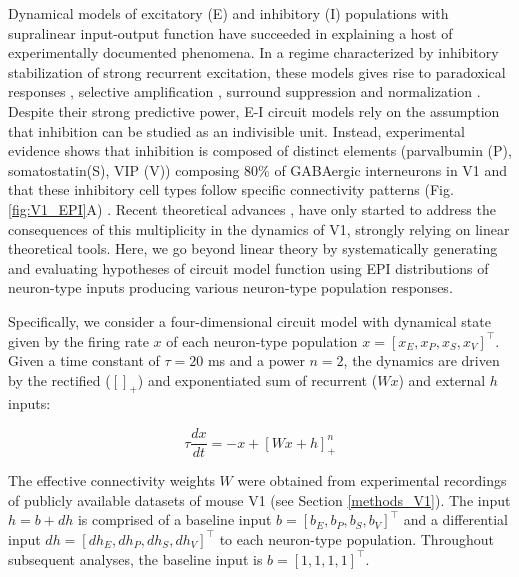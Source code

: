 \documentclass[11pt]{article}
\begin{document}
Dynamical models of excitatory (E) and inhibitory (I) populations with supralinear input-output function have succeeded in explaining a host of experimentally documented phenomena.
In a regime characterized by inhibitory stabilization of strong recurrent excitation, these models gives rise to paradoxical responses \cite{tsodyks1997paradoxical}, selective amplification  \cite{murphy2009balanced}, surround suppression \cite{ozeki2009inhibitory} and normalization \cite{rubin2015stabilized}. 
Despite their strong predictive power, E-I circuit models rely on the assumption that inhibition can be studied as an indivisible unit. 
Instead, experimental evidence shows that inhibition is composed of distinct elements (parvalbumin (P), somatostatin(S), VIP (V))
composing 80\% of GABAergic interneurons in V1 \cite{markram2004interneurons, rudy2011three, tremblay2016} and that these inhibitory cell types follow specific connectivity patterns (Fig. \ref{fig:V1_EPI}A) \cite{pfeffer2013inhibition}.
Recent theoretical advances \cite{litwin2016inhibitory, GarciaDelMolino2017, Chen2019},  have only started to address the consequences of this multiplicity in the dynamics of V1, strongly relying on linear theoretical tools. 
Here, we go beyond linear theory by systematically generating and evaluating hypotheses of circuit model function using EPI distributions of neuron-type inputs producing various neuron-type population responses.

Specifically, we consider a four-dimensional circuit model with dynamical state given by the firing rate $x$ of each neuron-type population $x = \left[x_E, x_P , x_S, x_V \right]^\top$. Given a time constant of $\tau = 20$ ms and a power $n = 2$, the dynamics are driven by the rectified ($\left[ \right]_+$) and exponentiated sum of recurrent ($Wx$) and external $h$ inputs:

\begin{equation}
\tau \frac{dx}{dt} = -x + [W x+ h]_+^n
\end{equation}

The effective connectivity weights $W$ were obtained from experimental recordings of publicly available datasets of mouse V1 \cite{allen2018layer, billeh2019systematic} (see Section \ref{methods_V1}).
The input $h = b + dh$ is comprised of a baseline input  $b = \left[ b_E, b_P , b_S , b_V \right]^\top$ and a differential input $dh = \left[ dh_E , dh_P , dh_S , dh_V\right]^\top$ to each neuron-type population.  
Throughout subsequent analyses, the baseline input is $b = \left[ 1 ,1,1,1\right]^\top$. 
\end{document}
